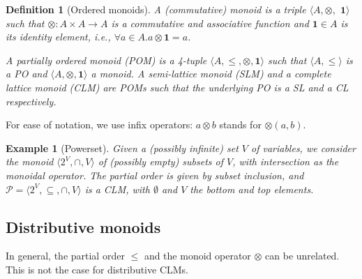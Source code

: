 \documentclass[a4paper]{elsarticle}
\newtheorem{definition}{Definition}
\newtheorem{example}{Example}
\newcommand{\monop}{\otimes}
\newcommand{\1}{\mathbf{1}}
\begin{document}
%
%

\begin{definition}[Ordered monoids]\label{defn:clm}
	A (commutative) monoid is a triple
	$\langle A, \monop,$ $\1 \rangle$ such that $\monop: A \times A \rightarrow A$ is
	a commutative and associative function and $\1 \in A$ is its \emph{identity} element,
	i.e., $\forall a \in A. a \monop \1 = a$.
	
	A partially ordered monoid (POM) is a 4-tuple
	$\langle A, \leq, \monop, \1 \rangle$ such that 	
	$\langle A, \leq \rangle$ is a PO and $\langle A, \monop, \1 \rangle$ a monoid.
	A semi-lattice monoid (SLM) and a complete lattice monoid (CLM) are 
	POMs such that the underlying PO is a SL and a CL respectively.
\end{definition}

For ease of notation, we use infix operators: $a \monop b$ stands for $\monop(a,b)$.

\begin{example}[Powerset]\label{ex:powerset}
	Given a (possibly infinite) set $V$ of variables, we consider
	the monoid $\langle 2^V, \cap, V \rangle$
	of (possibly empty) subsets of $V$, with intersection as the monoidal operator.
	The partial order is given by subset inclusion, and 
	$\mathcal{P} = \langle 2^V, \subseteq, \cap, V \rangle$
	is a CLM, with $\emptyset$ and $V$ the bottom and top elements. %
\end{example}

\subsection{Distributive monoids}

In general, the partial order $\leq$ and the monoid operator $\otimes$ can be unrelated.
This is not the case for distributive CLMs.
\end{document}
